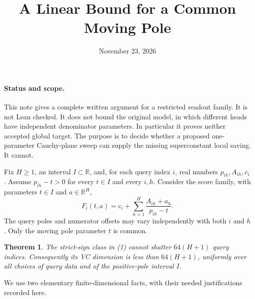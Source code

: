 \documentclass[11pt]{article}
\title{A Linear Bound for a Common Moving Pole}
\author{}
\date{November 23, 2026}
\newtheorem{theorem}{Theorem}
\begin{document}
\maketitle

\paragraph{Status and scope.}
This note gives a complete written argument for a restricted readout
family. It is not Lean checked. It does not bound the original model,
in which different heads have independent denominator parameters.
In particular it proves neither accepted global target. The purpose
is to decide whether a proposed one-parameter Cauchy-plane sweep can
supply the missing superconstant local saving. It cannot.

Fix $H\geq1$, an interval $I\subset\mathbb R$, and, for each query
index $i$, real numbers $p_{ih},A_{ih},c_i$. Assume
$p_{ih}-t>0$ for every $t\in I$ and every $i,h$. Consider the score
family, with parameters $t\in I$ and $a\in\mathbb R^H$,
\[
 F_i(t,a)=c_i+\sum_{h=1}^H\frac{A_{ih}+a_h}{p_{ih}-t}.
 \tag{1}
\]
The query poles and numerator offsets may vary independently with
both $i$ and $h$. Only the moving pole parameter $t$ is common.

\begin{theorem}
The strict-sign class in (1) cannot shatter $64(H+1)$ query indices.
Consequently its VC dimension is less than $64(H+1)$, uniformly over
all choices of query data and of the positive-pole interval $I$.
\end{theorem}

We use two elementary finite-dimensional facts, with their needed
justifications recorded here.
\end{document}

